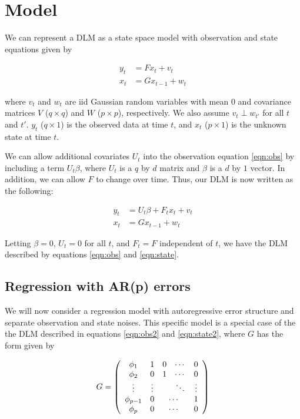 \documentclass{article}
\begin{document}
\section{Model} \label{sec:model}

We can represent a DLM as a state space model with observation and state equations given by

\begin{align}
y_t &= Fx_t + v_t \label{eqn:obs} \\
x_t &= Gx_{t-1} + w_t \label{eqn:state}
\end{align}

\noindent where $v_t$ and $w_t$ are iid Gaussian random variables with mean 0 and covariance matrices $V$ ($q \times q$) and $W$ ($p \times p$), respectively. We also assume $v_t \perp w_{t'}$ for all $t$ and $t'$. $y_t$ ($q \times 1$) is the observed data at time $t$, and $x_t$ ($p \times 1$) is the unknown state at time $t$.

We can allow additional covariates $U_t$ into the observation equation \eqref{eqn:obs} by including a term $U_t \beta$, where $U_t$ is a $q$ by $d$ matrix and $\beta$ is a $d$ by $1$ vector. In addition, we can allow $F$ to change over time. Thus, our DLM is now written as the following:

\begin{align}
y_t &= U_t\beta + F_tx_t + v_t \label{eqn:obs2} \\
x_t &= Gx_{t-1} + w_t \label{eqn:state2}
\end{align}

\noindent Letting $\beta = 0$, $U_t = 0$ for all $t$, and $F_t = F$ independent of $t$, we have the DLM described by equations \eqref{eqn:obs} and \eqref{eqn:state}.

\subsection{Regression with AR(p) errors}

We will now consider a regression model with autoregressive error structure and separate observation and state noises. This specific model is a special case of the the DLM described in equations \eqref{eqn:obs2} and \eqref{eqn:state2}, where $G$ has the form given by

\[G = \left(
\begin{array}{ccccc}
\phi_1 & 1 & 0 & \cdots & 0 \\
\phi_2 & 0 & 1 & \cdots & 0 \\
\vdots & \vdots & & \ddots & \vdots \\
\phi_{p-1} & 0 & \multicolumn{2}{c}{\cdots} & 1 \\
\phi_p & 0 & \multicolumn{2}{c}{\cdots} & 0
\end{array}
\right)\]
\end{document}
